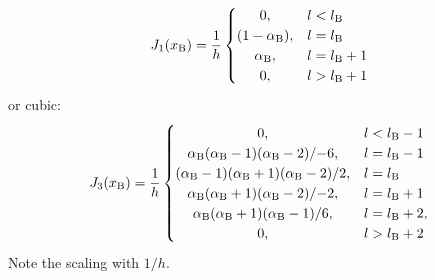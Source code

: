 \documentclass[twoside,a4paper,dvipsnames]{article}
\begin{document}
\begin{equation}\label{eq:linearSpreading}
     J_1(x_\text{B}) = \frac{1}{h}
     \begin{cases}
    \hfil 0, & l < l_{\text{B}}\\
    \hfil (1-\alpha_\text{B}), & l = l_{\text{B}}\\
    \hfil \alpha_\text{B}, & l = l_{\text{B}} + 1\\
    \hfil 0, & l > l_\text{B} + 1
\end{cases}
\end{equation}
or cubic:
\begin{equation}\label{eq:cubicInterpolation}
     J_3(x_\text{B}) = \frac{1}{h}
     \begin{cases}
    \hfil 0, & l < l_{\text{B}} - 1\\
    \hfil \alpha_\text{B}(\alpha_\text{B}-1)(\alpha_\text{B} - 2)/{-6}, & l = l_{\text{B}} - 1\\
    \hfil (\alpha_\text{B}-1)(\alpha_\text{B}+1)(\alpha_\text{B}-2)/2, & l = l_{\text{B}}\\
    \hfil \alpha_\text{B}(\alpha_\text{B}+1)(\alpha_\text{B} - 2)/{-2}, & l = l_{\text{B}} + 1\\
    \hfil \alpha_\text{B}(\alpha_\text{B}+1)(\alpha_\text{B} - 1)/6, & l = l_{\text{B}} +2,\\
    \hfil 0, & l > l_\text{B} + 2
\end{cases}
\end{equation}
Note the scaling with $1/h$.
\end{document}
